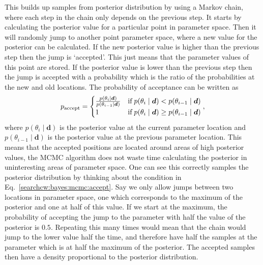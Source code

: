 This builds up samples from posterior distribution by using a Markov chain, where each
step in the chain only depends on the previous step.  
It starts by calculating the posterior value for a particular point in parameter space. Then it will
randomly jump to another point parameter space, where a new value for the
posterior can be calculated.  If the new posterior value is higher than the
previous step then the jump is `accepted'. This just means that the parameter
values of this point are stored.  If the posterior value is lower than the
previous step then the jump is accepted with a probability which is the ratio of the probabilities at the new and old locations.
The probability of acceptance can be written as
\begin{equation}
\label{searchcw:bayes:mcmc:accept}
	p_{\rm{accept}} = 
	\begin{cases}
		\frac{p(\theta_i \mid \bm{d})}{p(\theta_{i-1} \mid \bm{d})} & \text{if} \; p(\theta_i \mid \bm{d}) < p(\theta_{i-1} \mid \bm{d}) \\
		1 & \text{if} \; p(\theta_i \mid \bm{d}) \geq p(\theta_{i-1} \mid \bm{d}) \\
	\end{cases},
\end{equation}
where $p(\theta_i \mid \bm{d})$ is the posterior value at the current parameter location and $p(\theta_{i-1} \mid \bm{d})$ is the posterior value at the previous parameter location. 
This means that the accepted positions are located around areas of high
posterior values, the \gls{MCMC} algorithm does not waste time calculating the
posterior in uninteresting areas of parameter space.  
One can see this correctly samples the posterior distribution by thinking about the condition in Eq.~\ref{searchcw:bayes:mcmc:accept}. Say we only allow jumps between two locations in parameter space, one which corresponds to the maximum of the posterior and one at half of this value. 
If we start at the maximum, the probability of accepting the jump to the parameter with half the value of the posterior is $0.5$. Repeating this many times would mean that the chain would jump to the lower value half the time, and therefore have half the samples at the parameter which is at half the maximum of the posterior. 
The accepted samples then have a density proportional to the posterior distribution. 
%
